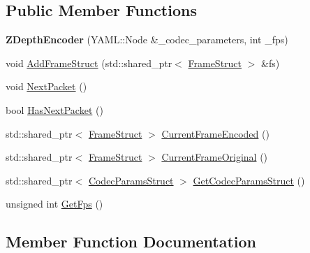 \subsection*{Public Member Functions}
\begin{DoxyCompactItemize}
\item 
\mbox{\label{classmoetsi_1_1ssp_1_1ZDepthEncoder_a97902734a32136d68782f4b8c9bf111c}} 
{\bfseries Z\+Depth\+Encoder} (Y\+A\+M\+L\+::\+Node \&\+\_\+codec\+\_\+parameters, int \+\_\+fps)
\item 
void \hyperlink{classmoetsi_1_1ssp_1_1ZDepthEncoder_aaacd9d8c4086d615e2a0254130787404}{Add\+Frame\+Struct} (std\+::shared\+\_\+ptr$<$ \hyperlink{structmoetsi_1_1ssp_1_1FrameStruct}{Frame\+Struct} $>$ \&fs)
\item 
void \hyperlink{classmoetsi_1_1ssp_1_1ZDepthEncoder_ae3911f396fc8b86c04c94dc71e1c0672}{Next\+Packet} ()
\item 
bool \hyperlink{classmoetsi_1_1ssp_1_1ZDepthEncoder_ac11aa1369150c2aa5ffa1d70d4e6ad5d}{Has\+Next\+Packet} ()
\item 
std\+::shared\+\_\+ptr$<$ \hyperlink{structmoetsi_1_1ssp_1_1FrameStruct}{Frame\+Struct} $>$ \hyperlink{classmoetsi_1_1ssp_1_1ZDepthEncoder_a075752f62bbc40f71026812c5548ef5f}{Current\+Frame\+Encoded} ()
\item 
std\+::shared\+\_\+ptr$<$ \hyperlink{structmoetsi_1_1ssp_1_1FrameStruct}{Frame\+Struct} $>$ \hyperlink{classmoetsi_1_1ssp_1_1ZDepthEncoder_abe5820ee0dea5fec22e398a7ba4d6777}{Current\+Frame\+Original} ()
\item 
std\+::shared\+\_\+ptr$<$ \hyperlink{structmoetsi_1_1ssp_1_1CodecParamsStruct}{Codec\+Params\+Struct} $>$ \hyperlink{classmoetsi_1_1ssp_1_1ZDepthEncoder_a3fc9f84387dba09d1deb4761031b598f}{Get\+Codec\+Params\+Struct} ()
\item 
unsigned int \hyperlink{classmoetsi_1_1ssp_1_1ZDepthEncoder_a9ea0a5783d7d265fccc3a2c262600552}{Get\+Fps} ()
\end{DoxyCompactItemize}


\subsection{Member Function Documentation}
\mbox{\label{classmoetsi_1_1ssp_1_1ZDepthEncoder_aaacd9d8c4086d615e2a0254130787404}} 
